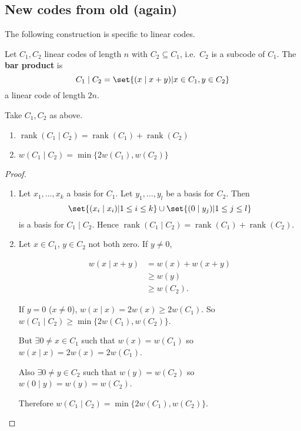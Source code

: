 \documentclass{article}
\newcommand{\barP}{\mid}
\newcommand{\1}[1]{\mathbbm{1}_{#1}}
\DeclareMathOperator{\rank}{rank}
\begin{document}
\subsection{New codes from old (again)}
The following construction is specific to linear codes.
\begin{defi}
    Let $C_1, C_2$ linear codes of length $n$ with $C_2 \subseteq C_1$, i.e.\ $C_2$ is a subcode of $C_1$. The \textbf{bar product} is
    \begin{equation*}
        C_1 \barP C_2 = \set{(x \barP x+y) | x \in C_1, y \in C_2}
    \end{equation*}
    a linear code of length $2n$.
\end{defi}
\begin{nlemma}\label{lem:2.25}
    Take $C_1, C_2$ as above.
    \begin{enumerate}[label=(\roman*)]
        \item $\rank(C_1 \barP C_2) = \rank(C_1) + \rank(C_2)$
        \item $w(C_1 \barP C_2) = \min \{ 2 w(C_1), w(C_2) \}$
    \end{enumerate}
\end{nlemma}
\begin{proof}\leavevmode
    \begin{enumerate}[label=(\roman*)]
        \item Let $x_1, \dotsc, x_k$ a basis for $C_1$.
            Let $y_1, \dotsc, y_l$ be a basis for $C_2$.
            Then \begin{equation*}\set{(x_i \barP x_i) | 1 \leq i \leq k} \cup \set{(0 \barP y_j) | 1 \leq j \leq l}\end{equation*} is a basis for $C_1 \barP C_2$.
            Hence $\rank(C_1 \barP C_2) = \rank(C_1) + \rank(C_2)$.
        \item Let $x \in C_1$, $y \in C_2$ not both zero.
            If $y \neq 0$,

            \begin{align*}w(x \barP x+y) &= w(x) + w(x+y)\\ &\geq w(y)\\ &\geq w(C_2).\end{align*}

            If $y = 0$ ($x \neq 0$), $w(x \barP x) = 2w(x) \geq 2w(C_1)$.
            So $w(C_1 \barP C_2) \geq \min\{2 w(C_1), w(C_2)\}$.

            But $\exists 0 \neq x \in C_1$ such that $w(x) = w(C_1)$ so $w(x \barP x) = 2 w(x) = 2 w(C_1)$.

            Also $\exists 0 \neq y \in C_2$ such that $w(y) = w(C_2)$ so $w(0 \barP y) = w(y) = w(C_2)$.

            Therefore $w(C_1 \barP C_2) = \min\{2 w(C_1), w(C_2)\}$. \qedhere
    \end{enumerate}
\end{proof}
\end{document}
